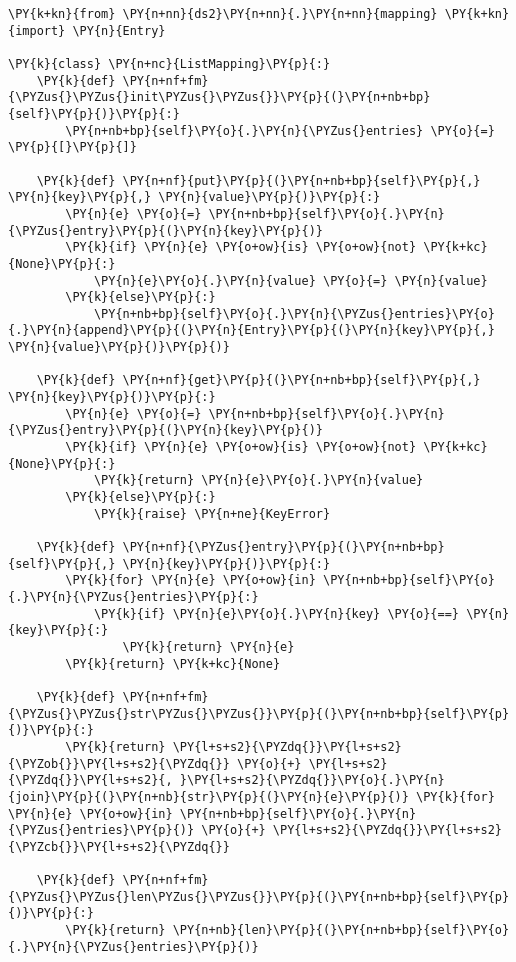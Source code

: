 \begin{Verbatim}[commandchars=\\\{\}]
\PY{k+kn}{from} \PY{n+nn}{ds2}\PY{n+nn}{.}\PY{n+nn}{mapping} \PY{k+kn}{import} \PY{n}{Entry}

\PY{k}{class} \PY{n+nc}{ListMapping}\PY{p}{:}
    \PY{k}{def} \PY{n+nf+fm}{\PYZus{}\PYZus{}init\PYZus{}\PYZus{}}\PY{p}{(}\PY{n+nb+bp}{self}\PY{p}{)}\PY{p}{:}
        \PY{n+nb+bp}{self}\PY{o}{.}\PY{n}{\PYZus{}entries} \PY{o}{=} \PY{p}{[}\PY{p}{]}

    \PY{k}{def} \PY{n+nf}{put}\PY{p}{(}\PY{n+nb+bp}{self}\PY{p}{,} \PY{n}{key}\PY{p}{,} \PY{n}{value}\PY{p}{)}\PY{p}{:}
        \PY{n}{e} \PY{o}{=} \PY{n+nb+bp}{self}\PY{o}{.}\PY{n}{\PYZus{}entry}\PY{p}{(}\PY{n}{key}\PY{p}{)}
        \PY{k}{if} \PY{n}{e} \PY{o+ow}{is} \PY{o+ow}{not} \PY{k+kc}{None}\PY{p}{:}
            \PY{n}{e}\PY{o}{.}\PY{n}{value} \PY{o}{=} \PY{n}{value}
        \PY{k}{else}\PY{p}{:}
            \PY{n+nb+bp}{self}\PY{o}{.}\PY{n}{\PYZus{}entries}\PY{o}{.}\PY{n}{append}\PY{p}{(}\PY{n}{Entry}\PY{p}{(}\PY{n}{key}\PY{p}{,} \PY{n}{value}\PY{p}{)}\PY{p}{)}

    \PY{k}{def} \PY{n+nf}{get}\PY{p}{(}\PY{n+nb+bp}{self}\PY{p}{,} \PY{n}{key}\PY{p}{)}\PY{p}{:}
        \PY{n}{e} \PY{o}{=} \PY{n+nb+bp}{self}\PY{o}{.}\PY{n}{\PYZus{}entry}\PY{p}{(}\PY{n}{key}\PY{p}{)}
        \PY{k}{if} \PY{n}{e} \PY{o+ow}{is} \PY{o+ow}{not} \PY{k+kc}{None}\PY{p}{:}
            \PY{k}{return} \PY{n}{e}\PY{o}{.}\PY{n}{value}
        \PY{k}{else}\PY{p}{:}
            \PY{k}{raise} \PY{n+ne}{KeyError}

    \PY{k}{def} \PY{n+nf}{\PYZus{}entry}\PY{p}{(}\PY{n+nb+bp}{self}\PY{p}{,} \PY{n}{key}\PY{p}{)}\PY{p}{:}
        \PY{k}{for} \PY{n}{e} \PY{o+ow}{in} \PY{n+nb+bp}{self}\PY{o}{.}\PY{n}{\PYZus{}entries}\PY{p}{:}
            \PY{k}{if} \PY{n}{e}\PY{o}{.}\PY{n}{key} \PY{o}{==} \PY{n}{key}\PY{p}{:}
                \PY{k}{return} \PY{n}{e}
        \PY{k}{return} \PY{k+kc}{None}

    \PY{k}{def} \PY{n+nf+fm}{\PYZus{}\PYZus{}str\PYZus{}\PYZus{}}\PY{p}{(}\PY{n+nb+bp}{self}\PY{p}{)}\PY{p}{:}
        \PY{k}{return} \PY{l+s+s2}{\PYZdq{}}\PY{l+s+s2}{\PYZob{}}\PY{l+s+s2}{\PYZdq{}} \PY{o}{+} \PY{l+s+s2}{\PYZdq{}}\PY{l+s+s2}{, }\PY{l+s+s2}{\PYZdq{}}\PY{o}{.}\PY{n}{join}\PY{p}{(}\PY{n+nb}{str}\PY{p}{(}\PY{n}{e}\PY{p}{)} \PY{k}{for} \PY{n}{e} \PY{o+ow}{in} \PY{n+nb+bp}{self}\PY{o}{.}\PY{n}{\PYZus{}entries}\PY{p}{)} \PY{o}{+} \PY{l+s+s2}{\PYZdq{}}\PY{l+s+s2}{\PYZcb{}}\PY{l+s+s2}{\PYZdq{}}

    \PY{k}{def} \PY{n+nf+fm}{\PYZus{}\PYZus{}len\PYZus{}\PYZus{}}\PY{p}{(}\PY{n+nb+bp}{self}\PY{p}{)}\PY{p}{:}
        \PY{k}{return} \PY{n+nb}{len}\PY{p}{(}\PY{n+nb+bp}{self}\PY{o}{.}\PY{n}{\PYZus{}entries}\PY{p}{)}


\end{Verbatim}
